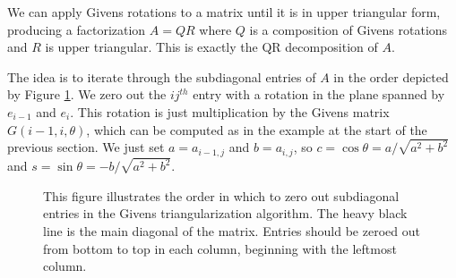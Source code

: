 We can apply Givens rotations to a matrix until it is in upper triangular form, producing a factorization $A = QR$ where $Q$ is a composition of Givens rotations and $R$ is upper triangular.
This is exactly the QR decomposition of $A$.

The idea is to iterate through the subdiagonal entries of $A$ in the order depicted by Figure \ref{fig:givens}.
We zero out the $ij^{th}$ entry with a rotation in the plane spanned by $e_{i-1}$ and $e_i$.
This rotation is just multiplication by the Givens matrix $G(i-1,i,\theta)$, which can be computed as in the example at the start of the previous section.
We just set $a=a_{i-1,j}$ and $b=a_{i,j}$, so $c = \cos \theta = a/\sqrt{a^2+b^2}$ and $s = \sin \theta = -b/\sqrt{a^2+b^2}$.

\begin{figure}
\begin{center}
\caption{This figure illustrates the order in which to zero out subdiagonal entries in the Givens triangularization algorithm.
The heavy black line is the main diagonal of the matrix.
Entries should be zeroed out from bottom to top in each column, beginning with the leftmost column.}
\label{fig:givens}
\end{center}
\end{figure}

